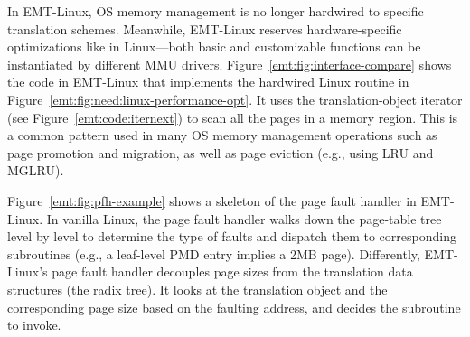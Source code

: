 In EMT-Linux, OS memory management is no longer
	hardwired to specific translation schemes.
Meanwhile, EMT-Linux reserves hardware-specific optimizations like in Linux---both %
	basic and customizable functions can be instantiated by different MMU drivers.
Figure~\ref{emt:fig:interface-compare} shows the code in
	EMT-Linux that implements the hardwired Linux routine in Figure~\ref{emt:fig:need:linux-performance-opt}.
It uses the translation-object iterator (see Figure~\ref{emt:code:iternext}) to scan all the pages in a memory region.
This is a common pattern used in 
	many OS memory management operations 
	such as page promotion and migration, as well as page eviction (e.g., using LRU and MGLRU).

Figure~\ref{emt:fig:pfh-example} shows a skeleton of the page fault handler in EMT-Linux.
In vanilla Linux, the page fault handler walks down the page-table tree level by level 
	to determine the type of faults and dispatch them to corresponding subroutines
	(e.g., a leaf-level PMD entry implies a 2MB page).
Differently, EMT-Linux's page fault handler decouples page sizes from the translation data structures (the radix tree).
It looks at the translation object and the corresponding page size based on the faulting address, 
	and decides the subroutine to invoke. 


